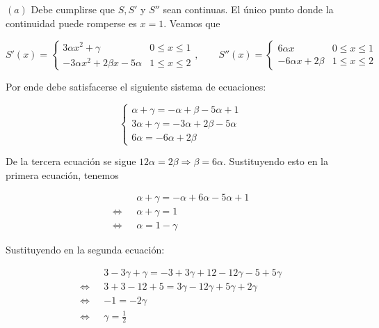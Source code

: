 \documentclass[12pt]{article}
\begin{document}
$(a)$ Debe cumplirse que $S, S'$ y $S''$ sean continuas. El único punto donde la
continuidad puede romperse es $x = 1$. Veamos que 

\begin{equation*}
    S'(x) = \begin{cases}
        3\alpha x^2 + \gamma & 0 \leq x \leq 1 \\ 
        -3\alpha x^2 + 2\beta x - 5\alpha & 1 \leq x \leq 2
    \end{cases}, \qquad S''(x) = \begin{cases}
        6\alpha x & 0 \leq x \leq 1 \\ 
        -6\alpha x + 2 \beta & 1 \leq x \leq 2
    \end{cases}
\end{equation*}

Por ende debe satisfacerse el siguiente sistema de ecuaciones: 

\begin{equation*}
    \begin{cases}
        \alpha + \gamma = -\alpha + \beta - 5\alpha + 1\\
        3\alpha + \gamma = -3\alpha + 2 \beta - 5 \alpha\\ 
        6\alpha = -6\alpha + 2 \beta
    \end{cases}
\end{equation*}

De la tercera ecuación se sigue $12\alpha = 2 \beta \Rightarrow \beta = 6
\alpha$. Sustituyendo esto en la primera ecuación, tenemos 

\begin{align*}
    &\alpha + \gamma = - \alpha + 6 \alpha - 5 \alpha + 1 \\ 
    \iff ~ ~ ~ 
    &\alpha + \gamma = 1 \\ 
    \iff ~ ~ ~ 
    &\alpha = 1 - \gamma
\end{align*}

Sustituyendo en la segunda ecuación:

\begin{align*}
    &3 - 3\gamma + \gamma = -3 + 3\gamma + 12 - 12\gamma - 5 + 5\gamma \\ 
    \iff ~ ~ ~ 
    &3 + 3 - 12 + 5 = 3\gamma -12 \gamma + 5 \gamma + 2 \gamma \\ 
    \iff ~ ~ ~ 
    &-1 = -2\gamma \\ 
    \iff ~ ~ ~ 
    &\gamma = \frac{1}{2}
\end{align*}
\end{document}
